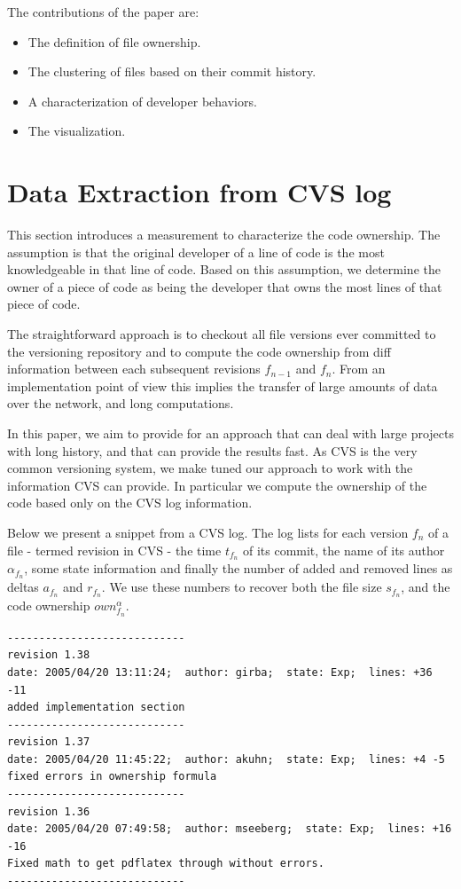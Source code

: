 \documentclass[10pt]{book}
\begin{document}
The contributions of the paper are:
\begin{itemize}
\item The definition of file ownership.
\item The clustering of files based on their commit history.
\item A characterization of developer behaviors.
\item The \omap visualization.
\end{itemize}

\section{Data Extraction from CVS log}\label{sec:ownership}

This section introduces a measurement to characterize the code ownership. The assumption is that the original developer of a line of code is the most knowledgeable in that line of code. Based on this assumption, we determine the owner of a piece of code as being the developer that owns the most lines  of that piece of code.

The straightforward approach is to checkout all file versions ever committed to the versioning repository and to compute the code ownership from diff information between each subsequent revisions $f_{n-1}$ and $f_n$. From an implementation point of view this implies the transfer of large amounts of data over the network, and long computations.

In this paper, we aim to provide for an approach that can deal with large projects with long history, and that can provide the results fast. As CVS is the very common versioning system, we make tuned our approach to work with the information CVS can provide. In particular we compute the ownership of the code based only on the CVS log information.

Below we present a snippet from a CVS log. The log lists for each version $f_n$ of a file \-- termed revision in CVS \-- the time $t_{f_n}$ of its commit, the name of its author $\alpha_{f_n}$, some state information and finally the number of added and removed lines as deltas $a_{f_n}$ and $r_{f_n}$. We use these numbers to recover both the file size $s_{f_n}$, and the code ownership $own_{f_n}^\alpha$.

\begin{tiny}\begin{verbatim}
----------------------------
revision 1.38
date: 2005/04/20 13:11:24;  author: girba;  state: Exp;  lines: +36 -11
added implementation section
----------------------------
revision 1.37
date: 2005/04/20 11:45:22;  author: akuhn;  state: Exp;  lines: +4 -5
fixed errors in ownership formula
----------------------------
revision 1.36
date: 2005/04/20 07:49:58;  author: mseeberg;  state: Exp;  lines: +16 -16
Fixed math to get pdflatex through without errors.
----------------------------
\end{verbatim}\end{tiny}
\end{document}

